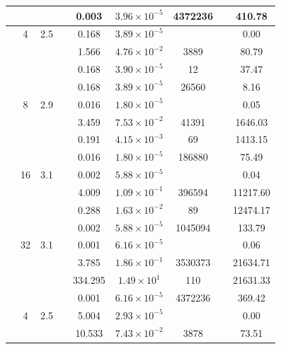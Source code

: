 \begin{table}[htbp]
\begin{tabular}{l S[table-format=3.0] S[table-format=4.1] l S[table-format=3.3] S[table-format=1.2e2] S[table-format=6.0] S[table-format=2.0] S[table-format=4.2]}
     &  &  &  & 0.003 & $3.96 \times 10^{-5}$ & 4372236 & {\text{---}} & 410.78 \\
    \midrule
     & 4 & 2.5 &  & 0.168 & $3.89 \times 10^{-5}$ & {\text{---}} & {\text{---}} & 0.00 \\
     &  &  &  & 1.566 & $4.76 \times 10^{-2}$ & 3889 & {\text{---}} & 80.79 \\
     &  &  &  & 0.168 & $3.90 \times 10^{-5}$ & 12 & {\text{---}} & 37.47 \\
     &  &  &  & 0.168 & $3.89 \times 10^{-5}$ & 26560 & {\text{---}} & 8.16 \\
     & 8 & 2.9 &  & 0.016 & $1.80 \times 10^{-5}$ & {\text{---}} & {\text{---}} & 0.05 \\
     &  &  &  & 3.459 & $7.53 \times 10^{-2}$ & 41391 & {\text{---}} & 1646.03 \\
     &  &  &  & 0.191 & $4.15 \times 10^{-3}$ & 69 & {\text{---}} & 1413.15 \\
     &  &  &  & 0.016 & $1.80 \times 10^{-5}$ & 186880 & {\text{---}} & 75.49 \\
     & 16 & 3.1 &  & 0.002 & $5.88 \times 10^{-5}$ & {\text{---}} & {\text{---}} & 0.04 \\
     &  &  &  & 4.009 & $1.09 \times 10^{-1}$ & 396594 & {\text{---}} & 11217.60 \\
     &  &  &  & 0.288 & $1.63 \times 10^{-2}$ & 89 & {\text{---}} & 12474.17 \\
     &  &  &  & 0.002 & $5.88 \times 10^{-5}$ & 1045094 & {\text{---}} & 133.79 \\
     & 32 & 3.1 &  & 0.001 & $6.16 \times 10^{-5}$ & {\text{---}} & {\text{---}} & 0.06 \\
     &  &  &  & 3.785 & $1.86 \times 10^{-1}$ & 3530373 & {\text{---}} & 21634.71 \\
     &  &  &  & 334.295 & $1.49 \times 10^{1}$ & 110 & {\text{---}} & 21631.33 \\
     &  &  &  & 0.001 & $6.16 \times 10^{-5}$ & 4372236 & {\text{---}} & 369.42 \\
    \midrule
     & 4 & 2.5 &  & 5.004 & $2.93 \times 10^{-5}$ & {\text{---}} & {\text{---}} & 0.00 \\
     &  &  &  & 10.533 & $7.43 \times 10^{-2}$ & 3878 & {\text{---}} & 73.51 \\

\end{tabular}
\end{table}

